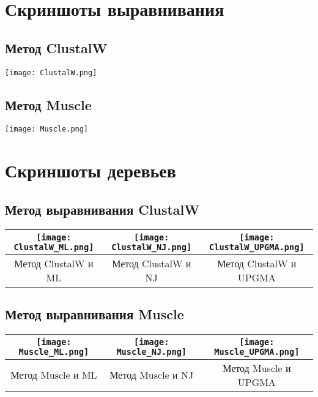 \documentclass{article}
\begin{document}
  \section{Скриншоты выравнивания}
  \subsection{Метод ClustalW}
  \texttt{[image: ClustalW.png]}
  \subsection{Метод Muscle}
  \texttt{[image: Muscle.png]}

  \section{Скриншоты деревьев}
  \subsection{Метод выравнивания ClustalW}
  \begin{center}
    \begin{tabular}{|C|C|C|}
      \hline
      \texttt{[image: ClustalW\_ML.png]} &
      \texttt{[image: ClustalW\_NJ.png]} &
      \texttt{[image: ClustalW\_UPGMA.png]} \\\hline
      Метод ClustalW и ML &
      Метод ClustalW и NJ &
      Метод ClustalW и UPGMA \\\hline
    \end{tabular}
  \end{center}

  \subsection{Метод выравнивания Muscle}
  \begin{center}
    \begin{tabular}{|C|C|C|}
      \hline
      \texttt{[image: Muscle\_ML.png]} &
      \texttt{[image: Muscle\_NJ.png]} &
      \texttt{[image: Muscle\_UPGMA.png]} \\\hline
      Метод Muscle и ML &
      Метод Muscle и NJ &
      Метод Muscle и UPGMA \\\hline
    \end{tabular}
  \end{center}
\end{document}
